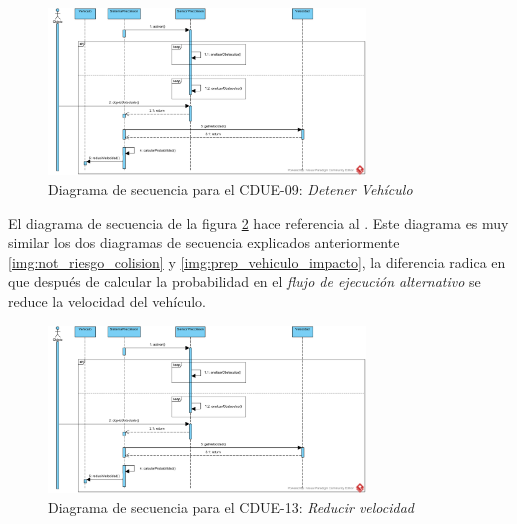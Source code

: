 \begin{figure}[h]
  \begin{center}
    \includegraphics[width=0.75\textwidth]{./img/diagramas_de_secuencia/CDUE-13.png}
  \end{center}
  \caption{Diagrama de secuencia para el CDUE-09: \textit{Detener Vehículo}}
  \label{img:reducir_velocidad}
\end{figure}

\par El diagrama de secuencia de la figura \ref{img:detener_vehiculo} hace referencia al . Este diagrama es muy similar los dos diagramas de secuencia explicados anteriormente \ref{img:not_riesgo_colision} y \ref{img:prep_vehiculo_impacto}, la diferencia radica en que después de calcular la probabilidad en el \textit{flujo de ejecución alternativo} se reduce la velocidad del vehículo.

\begin{figure}[h]
  \begin{center}
    \includegraphics[width=0.75\textwidth]{./img/diagramas_de_secuencia/CDUE-13.png}
  \end{center}
  \caption{Diagrama de secuencia para el CDUE-13: \textit{Reducir velocidad}}
  \label{img:detener_vehiculo}
\end{figure}
